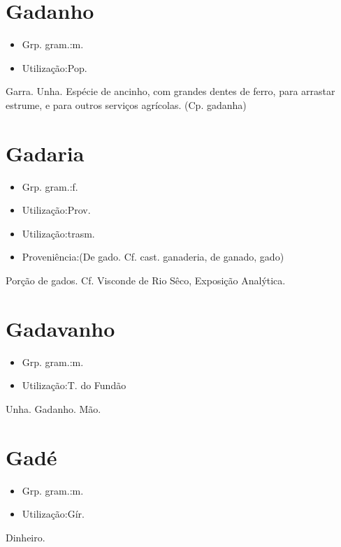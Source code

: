 \section{Gadanho}
\begin{itemize}
\item {Grp. gram.:m.}
\end{itemize}
\begin{itemize}
\item {Utilização:Pop.}
\end{itemize}
Garra.
Unha.
Espécie de ancinho, com grandes dentes de ferro, para arrastar estrume, e para outros serviços agrícolas.
(Cp. \textunderscore gadanha\textunderscore )
\section{Gadaria}
\begin{itemize}
\item {Grp. gram.:f.}
\end{itemize}
\begin{itemize}
\item {Utilização:Prov.}
\end{itemize}
\begin{itemize}
\item {Utilização:trasm.}
\end{itemize}
\begin{itemize}
\item {Proveniência:(De \textunderscore gado\textunderscore . Cf. cast. \textunderscore ganaderia\textunderscore , de \textunderscore ganado\textunderscore , gado)}
\end{itemize}
Porção de gados. Cf. Visconde de Rio Sêco, \textunderscore Exposição Analýtica\textunderscore .
\section{Gadavanho}
\begin{itemize}
\item {Grp. gram.:m.}
\end{itemize}
\begin{itemize}
\item {Utilização:T. do Fundão}
\end{itemize}
Unha.
Gadanho.
Mão.
\section{Gadé}
\begin{itemize}
\item {Grp. gram.:m.}
\end{itemize}
\begin{itemize}
\item {Utilização:Gír.}
\end{itemize}
Dinheiro.
